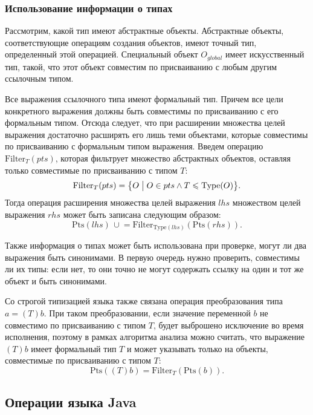 \documentclass[14pt,titlepage]{extarticle}
\newcommand{\Type}[1]{\textrm{Type}(#1)}
\newcommand{\Pts}[1]{\textrm{Pts}(#1)}
\newcommand{\Filter}[2]{\textrm{Filter}_{#1}(#2)}
\newcommand{\cupe}{\,\cup\!\!=}
\renewcommand{\leq}{\leqslant}
\newcommand{\eng}[1]{{\English#1}}
\newcommand{\java}{\eng{Java}\xspace}
\begin{document}
      \subsubsection{Использование информации о типах}

        Рассмотрим, какой тип имеют абстрактные объекты. Абстрактные объекты,
        соответствующие операциям создания объектов, имеют точный тип,
        определенный этой операцией.
        Специальный объект $O_{global}$ имеет искусственный тип, такой, что
        этот объект совместим по присваиванию с любым другим ссылочным типом.

        Все выражения ссылочного типа имеют формальный тип. Причем все цели
        конкретного выражения должны быть совместимы по присваиванию с его
        формальным типом.
        Отсюда следует, что при расширении множества целей выражения
        достаточно расширять его лишь теми объектами, которые совместимы по
        присваиванию с формальным типом выражения.
        Введем операцию $\Filter{T}{pts}$, которая фильтрует множество
        абстрактных объектов, оставляя только совместимые по присваиванию с
        типом $T$:
        \[ \Filter{T}{pts} =
           \bigl\{ O \bigm| O \in pts \land T \leq \Type{O} \bigr\}. \]
        Тогда операция расширения множества целей выражения $lhs$ множеством
        целей выражения $rhs$ может быть записана следующим образом:
        \[ \Pts{lhs} \cupe \Filter{\Type{lhs}}{\Pts{rhs}}. \]

        Также информация о типах может быть использована при проверке, могут ли
        два выражения быть синонимами. В первую очередь нужно проверить,
        совместимы ли их типы: если нет, то они точно не могут содержать ссылку
        на один и тот же объект и быть синонимами.

        Со строгой типизацией языка также связана операция преобразования типа
        $a = (T)b$.
        При таком преобразовании, если значение переменной $b$ не совместимо
        по присваиванию с типом $T$, будет выброшено исключение во время
        исполнения, поэтому в рамках алгоритма анализа можно считать, что
        выражение $(T)b$ имеет формальный тип $T$ и может указывать только на
        объекты, совместимые по присваиванию с типом $T$:
        \[\Pts{(T)b} = \Filter{T}{\Pts{b}}.\]

    \subsection{\texorpdfstring{Операции языка \java}
                               {Операции языка Java}}
      \label{section:operations}
\end{document}
